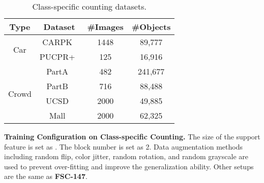 \documentclass[10pt,twocolumn,letterpaper]{article}
\begin{document}
\begin{table}[h]
\begin{minipage}[t]{0.5\textwidth}
\setlength\tabcolsep{6pt}
\centering
\scriptsize
\caption{Class-specific counting datasets.}
\vspace{5pt}
\begin{threeparttable}
\begin{tabular}{cccc}
\toprule
Type & Dataset & \#Images & \#Objects \\
\midrule
\multirow{2}{*}{Car}
& CARPK~\cite{lpn} & 1448 & 89,777 \\
& PUCPR+~\cite{lpn} & 125 & 16,916 \\
\midrule
\multirow{4}{*}{Crowd}
& PartA~\cite{mcnn} & 482 & 241,677 \\
& PartB~\cite{mcnn} & 716 & 88,488 \\
& UCSD~\cite{ucsd} & 2000 & 49,885 \\
& Mall~\cite{mall} & 2000 & 62,325 \\
\bottomrule
\end{tabular}
\end{threeparttable}
\label{appendix:tab:datasets}
\end{minipage}
\end{table}


\vspace{2pt}\noindent\textbf{Training Configuration on Class-specific Counting.}
The size of the support feature is set as . 
The block number is set as 2. 
Data augmentation methods including random flip, color jitter, random rotation, and random grayscale are used to prevent over-fitting and improve the generalization ability. 
Other setups are the same as \textbf{FSC-147}. 
\end{document}
